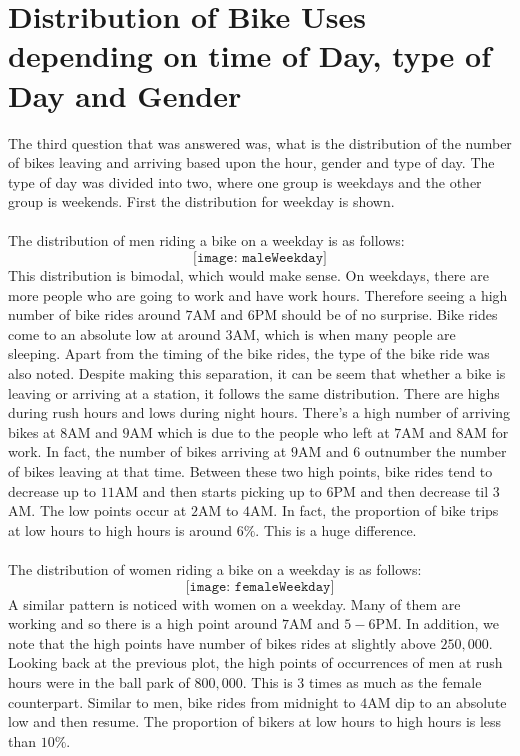 \documentclass{article}
\begin{document}
\section{Distribution of Bike Uses depending on time of Day, type of Day and Gender}
The third question that was answered was, what is the distribution of the number of bikes leaving and arriving based upon the hour, gender and type of day. The type of day was divided into two, where one group is weekdays and the other group is weekends. First the distribution for weekday is shown. \\~\\
The distribution of men riding a bike on a weekday is as follows: 
$$ \texttt{[image: maleWeekday]} $$ 
This distribution is bimodal, which would make sense. On weekdays, there are more people who are going to work and have work hours. Therefore seeing a high number of bike rides around $7$AM and $6$PM should be of no surprise. Bike rides come to an absolute low at around $3$AM, which is when many people are sleeping. Apart from the timing of the bike rides, the type of the bike ride was also noted. Despite making this separation, it can be seem that whether a bike is leaving or arriving at a station, it follows the same distribution. There are highs during rush hours and lows during night hours. There's a high number of arriving bikes at $8$AM and $9$AM which is due to the people who left at $7$AM and $8$AM for work. In fact, the number of bikes arriving at $9$AM and $6$ outnumber the number of bikes leaving at that time. Between these two high points, bike rides tend to decrease up to $11$AM and then starts picking up to $6$PM and then decrease til $3$AM. The low points occur at $2$AM to $4$AM. In fact, the proportion of bike trips at low hours to high hours is around $6\%$. This is a huge difference. 
\\~\\

The distribution of women riding a bike on a weekday is as follows: 
$$ \texttt{[image: femaleWeekday]} $$ 
A similar pattern is noticed with women on a weekday. Many of them are working and so there is a high point around $7$AM and $5-6$PM. In addition, we note that the high points have number of bikes rides at slightly above $250,000$. Looking back at the previous plot, the high points of occurrences of men at rush hours were in the ball park of $800,000$. This is $3$ times as much as the female counterpart. Similar to men, bike rides from midnight to $4$AM dip to an absolute low and then resume. The proportion of bikers at low hours to high hours is less than $10\%$. \\~\\
\end{document}
